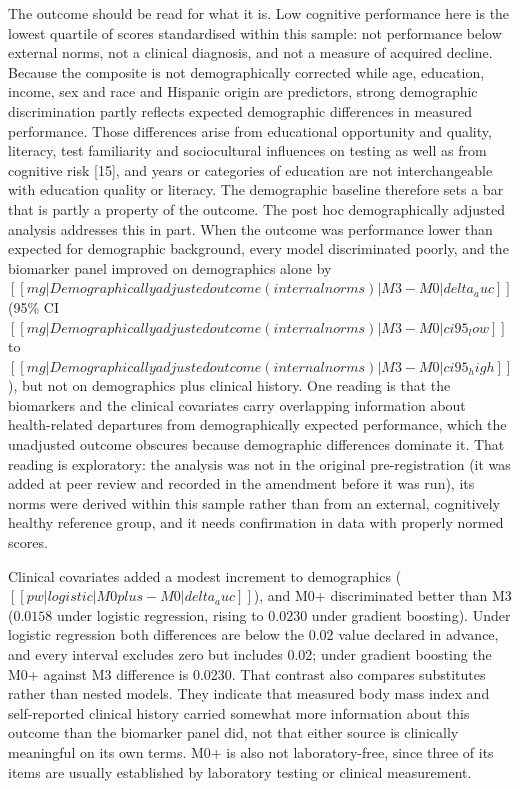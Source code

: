 \documentclass[12pt]{article}
\begin{document}
The outcome should be read for what it is. Low cognitive performance here is the lowest quartile of scores standardised within this sample: not performance below external norms, not a clinical diagnosis, and not a measure of acquired decline. Because the composite is not demographically corrected while age, education, income, sex and race and Hispanic origin are predictors, strong demographic discrimination partly reflects expected demographic differences in measured performance. Those differences arise from educational opportunity and quality, literacy, test familiarity and sociocultural influences on testing as well as from cognitive risk [15], and years or categories of education are not interchangeable with education quality or literacy. The demographic baseline therefore sets a bar that is partly a property of the outcome. The post hoc demographically adjusted analysis addresses this in part. When the outcome was performance lower than expected for demographic background, every model discriminated poorly, and the biomarker panel improved on demographics alone by $[[mg|Demographically adjusted outcome (internal norms)|M3 - M0|delta_auc]]$ (95\% CI $[[mg|Demographically adjusted outcome (internal norms)|M3 - M0|ci95_low]]$ to $[[mg|Demographically adjusted outcome (internal norms)|M3 - M0|ci95_high]]$), but not on demographics plus clinical history. One reading is that the biomarkers and the clinical covariates carry overlapping information about health-related departures from demographically expected performance, which the unadjusted outcome obscures because demographic differences dominate it. That reading is exploratory: the analysis was not in the original pre-registration (it was added at peer review and recorded in the amendment before it was run), its norms were derived within this sample rather than from an external, cognitively healthy reference group, and it needs confirmation in data with properly normed scores.

Clinical covariates added a modest increment to demographics ($[[pw|logistic|M0plus - M0|delta_auc]]$), and M0+ discriminated better than M3 ($0.0158$ under logistic regression, rising to $0.0230$ under gradient boosting). Under logistic regression both differences are below the 0.02 value declared in advance, and every interval excludes zero but includes 0.02; under gradient boosting the M0+ against M3 difference is 0.0230. That contrast also compares substitutes rather than nested models. They indicate that measured body mass index and self-reported clinical history carried somewhat more information about this outcome than the biomarker panel did, not that either source is clinically meaningful on its own terms. M0+ is also not laboratory-free, since three of its items are usually established by laboratory testing or clinical measurement.
\end{document}
